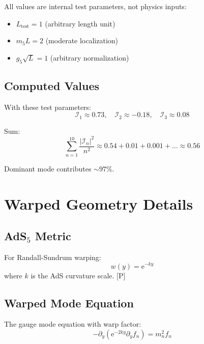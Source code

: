 \documentclass[11pt,a4paper]{article}
\newcommand{\ee}{\mathrm{e}}
\begin{document}
All values are internal test parameters, not physics inputs:
\begin{itemize}
\item $L_{\text{test}} = 1$ (arbitrary length unit)
\item $m_5 L = 2$ (moderate localization)
\item $g_5 \sqrt{L} = 1$ (arbitrary normalization)
\end{itemize}

\subsection{Computed Values}

With these test parameters:
\begin{equation}
\mathcal{I}_1 \approx 0.73, \quad \mathcal{I}_2 \approx -0.18, \quad \mathcal{I}_3 \approx 0.08
\label{eq:test-overlaps}
\end{equation}

Sum:
\begin{equation}
\sum_{n=1}^{10} \frac{|\mathcal{I}_n|^2}{n^2} \approx 0.54 + 0.01 + 0.001 + \ldots \approx 0.56
\label{eq:test-sum}
\end{equation}

Dominant mode contributes $\sim 97\%$.

\section{Warped Geometry Details}
\label{app:warped}

\subsection{AdS$_5$ Metric}

For Randall-Sundrum warping:
\begin{equation}
w(y) = \ee^{-ky}
\label{eq:warp-rs}
\end{equation}
where $k$ is the AdS curvature scale. [P]

\subsection{Warped Mode Equation}

The gauge mode equation with warp factor:
\begin{equation}
-\partial_y(\ee^{-2ky}\partial_y f_n) = m_n^2 f_n
\label{eq:warped-mode-eq}
\end{equation}
\end{document}
